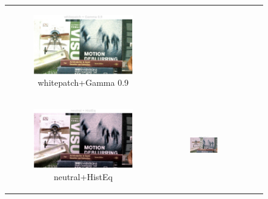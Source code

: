 \documentclass[11pt, a4]{article}
\begin{document}
\begin{enumerate}
\begin{figure}[h]
{\begin{tabular}{cccc}
\begin{subfigure}[h]{0.45\linewidth}
							\includegraphics[width=\linewidth]{../output/RawImage1_Tone_whitepatch_Gamma0.9.pdf}
							\caption{whitepatch+Gamma 0.9}
							\label{fig:RawImage1_tone_8}
						\end{subfigure}\\
						\begin{subfigure}[h]{0.45\linewidth}
							\centering
							\includegraphics[width=\linewidth]{../output/RawImage1_Tone_neutral_HistEq.pdf}
							\caption{neutral+HistEq}
							\label{fig:RawImage1_tone_9}
						\end{subfigure} &
						\begin{subfigure}[h]{0.45\linewidth}
							\centering
							\includegraphics[width=\linewidth]{../output/RawImage1_Tone_neutral_Gamma0.5.pdf}

\end{subfigure}
\end{tabular}}
\end{figure}
\end{enumerate}
\end{document}
